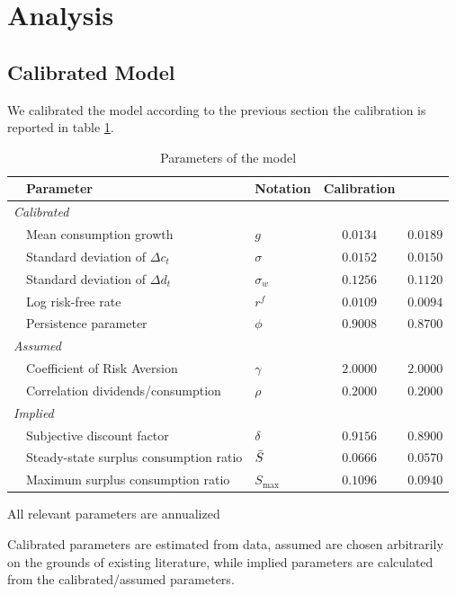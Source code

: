 \section{Analysis} \label{sec:Analysis}
\subsection{Calibrated Model}
We calibrated the model according to the previous section the calibration is reported in table \ref{tab:ModelCalib}.
\begin{table}[H]
\begin{adjustbox}{max width=\textwidth}
\begin{threeparttable}[b]
\caption{Parameters of the model}
\label{tab:ModelCalib}
\begin{tabular}{@{}lllcc@{}}
\toprule
 & Parameter                              & Notation         & Calibration & \citet{Campbell1999}\\ \midrule 
\multicolumn{5}{l}{\textit{Calibrated}}                                            \\
 & Mean consumption growth                & $g$              & $0.0134$  & $0.0189$\\
 & Standard deviation of $\Delta c_t$     & $\sigma$         & $0.0152$  & $0.0150$\\
 & Standard deviation of $\Delta d_t$     & $\sigma_w$       & $0.1256$  & $0.1120$\\
 & Log risk-free rate                     & $r^f$            & $0.0109$  & $0.0094$\\
 & Persistence parameter                  & $\phi$           & $0.9008$  & $0.8700$\\
 \multicolumn{5}{l}{\textit{Assumed}}                                              \\
 & Coefficient of Risk Aversion           & $\gamma$         & $2.0000$  & $2.0000$\\
 & Correlation dividends/consumption      & $\rho$           & $0.2000$  & $0.2000$\\
\multicolumn{5}{l}{\textit{Implied}}                                               \\
 & Subjective discount factor             & $\delta$         & $0.9156$  & $0.8900$\\
 & Steady-state surplus consumption ratio & $\Bar{S}$        & $0.0666$  & $0.0570$\\
 & Maximum surplus consumption ratio      & $S_{\text{max}}$ & $0.1096$  & $0.0940$\\ \bottomrule
\end{tabular}
\begin{tablenotes}
\footnotesize{\item [1] All relevant parameters are annualized
              \item [2] Calibrated parameters are estimated from data, assumed are chosen arbitrarily on the grounds of existing literature, while implied parameters are calculated from the calibrated/assumed parameters.}
\end{tablenotes}
\end{threeparttable}
\end{adjustbox}
\end{table}

